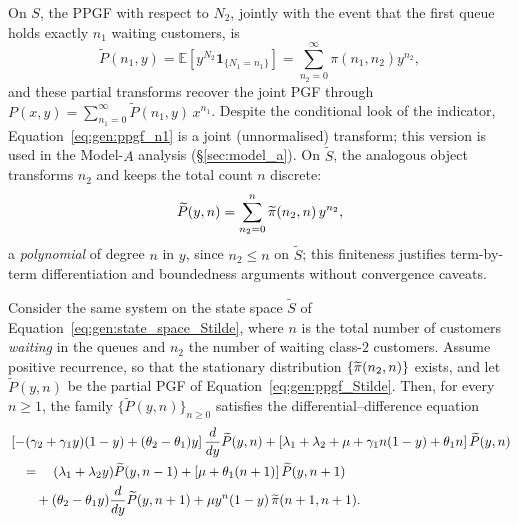 On $S$, the PPGF with respect to $N_2$, jointly with the event that the first queue holds exactly $n_1$ waiting customers, is
\begin{equation}
    \widetilde{P}(n_1, y) = \mathbb{E} \left[y^{N_2} \mathbf{1}_{\{ N_1=n_1\}} \right] = \sum_{n_2=0}^{\infty} \pi(n_1,n_2) y^{n_2},
    \label{eq:gen:ppgf_n1}
\end{equation}
and these partial transforms recover the joint PGF through $P(x,y) = \sum_{n_1=0}^{\infty} \widetilde{P}(n_1, y)\, x^{n_1}$. Despite the conditional look of the indicator, Equation~\eqref{eq:gen:ppgf_n1} is a joint (unnormalised) transform; this version is used in the Model-$A$ analysis (\S\ref{sec:model_a}). On $\widetilde{S}$, the analogous object transforms $n_2$ and keeps the total count $n$ discrete:
\begin{equation}
    \widetilde{P}(y,n)=\sum_{n_2=0}^{n}\widetilde{\pi}(n_2,n)\,y^{n_2},
    \label{eq:gen:ppgf_Stilde}
\end{equation}
a \emph{polynomial} of degree $n$ in $y$, since $n_2\le n$ on $\widetilde{S}$; this finiteness justifies term-by-term differentiation and boundedness arguments without convergence caveats.

\begin{lemma}\label{lem:gen:PPGF_dynamics}
    Consider the same system on the state space $\widetilde{S}$ of
    Equation~\eqref{eq:gen:state_space_Stilde}, where $n$ is the total number of customers
    \emph{waiting} in the queues and $n_2$ the number of waiting class-$2$ customers.
    Assume positive recurrence, so that the stationary distribution
    $\{\widetilde{\pi}(n_2,n)\}$ exists, and let $\widetilde{P}(y,n)$ be the partial PGF of
    Equation~\eqref{eq:gen:ppgf_Stilde}. Then, for every $n\ge 1$, the family
    $\{\widetilde{P}(y,n)\}_{n\ge 0}$ satisfies the differential--difference equation
    \begin{equation*}
    \begin{split}
        & \left[ -(\gamma_2 + \gamma_1 y)(1-y) + (\theta_2 - \theta_1) y \right] \frac{d}{dy} \widetilde{P}(y,n)
          + \left[ \lambda_1 + \lambda_2 + \mu + \gamma_1 n(1-y) + \theta_1 n \right] \widetilde{P}(y,n) \\
        & \quad = \quad (\lambda_1 + \lambda_2 y) \widetilde{P}(y,n-1)
          + \left[ \mu + \theta_1 (n+1) \right] \widetilde{P}(y,n+1) \\
        & \quad \quad + (\theta_2 - \theta_1 y) \frac{d}{dy} \widetilde{P}(y,n+1)
          + \mu y^{n} (1-y)\, \widetilde{\pi}(n+1,n+1).
    \end{split}
    \end{equation*}
\end{lemma}

